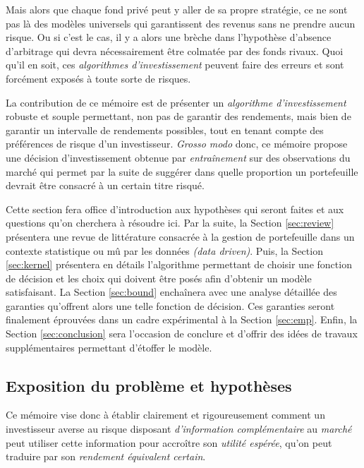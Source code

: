 Mais alors que chaque fond privé peut y aller de sa propre stratégie, ce ne sont pas là
des modèles universels qui garantissent des revenus sans ne prendre aucun risque. Ou si
c'est le cas, il y a alors une brèche dans l'hypothèse d'absence d'arbitrage qui devra
nécessairement être colmatée par des fonds rivaux. Quoi qu'il en soit, ces
\textit{algorithmes d'investissement} peuvent faire des erreurs et sont forcément exposés
à toute sorte de risques.

La contribution de ce mémoire est de présenter un \textit{algorithme d'investissement}
robuste et souple permettant, non pas de garantir des rendements, mais bien de garantir un
intervalle de rendements possibles, tout en tenant compte des préférences de risque d'un
investisseur. \textit{Grosso modo} donc, ce mémoire propose une décision d'investissement
obtenue par \textit{entraînement} sur des observations du marché qui permet par la suite
de suggérer dans quelle proportion un portefeuille devrait être consacré à un certain
titre risqué.

Cette section fera office d'introduction aux hypothèses qui seront faites et aux questions
qu'on cherchera à résoudre ici. Par la suite, la Section \ref{sec:review} présentera une
revue de littérature consacrée à la gestion de portefeuille dans un contexte statistique
ou mû par les données \textsl{(data driven)}. Puis, la Section \ref{sec:kernel} présentera
en détails l'algorithme permettant de choisir une fonction de décision et les choix qui
doivent être posés afin d'obtenir un modèle satisfaisant. La Section \ref{sec:bound}
enchaînera avec une analyse détaillée des garanties qu'offrent alors une telle fonction de
décision. Ces garanties seront finalement éprouvées dans un cadre expérimental à la
Section \ref{sec:emp}. Enfin, la Section \ref{sec:conclusion} sera l'occasion de conclure
et d'offrir des idées de travaux supplémentaires permettant d'étoffer le modèle.



\subsection{Exposition du problème et hypothèses}

Ce mémoire vise donc à établir clairement et rigoureusement comment un investisseur averse
au risque disposant \textit{d'information complémentaire} au \textit{marché} peut utiliser
cette information pour accroître son \textit{utilité espérée}, qu'on peut traduire par son
\textit{rendement équivalent certain}.


